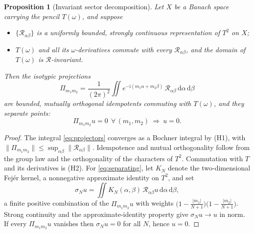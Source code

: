 \documentclass[aps,prd,reprint,superscriptaddress,nofootinbib,longbibliography]{revtex4-2}
\theoremstyle{plain}
\newtheorem{proposition}[theorem]{Proposition}
\theoremstyle{definition}
\theoremstyle{remark}
\newcommand{\dd}{\mathrm{d}}
\newcommand{\ii}{\mathrm{i}}
\begin{document}
\begin{proposition}[Invariant sector decomposition]\label{prop:decomp}
Let $X$ be a Banach space carrying the pencil $T(\omega)$, and suppose
\begin{itemize}
\item[(H1)] $\{\mathcal{R}_{\alpha\beta}\}$ is a uniformly bounded, strongly
continuous representation of $T^2$ on $X$;
\item[(H2)] $T(\omega)$ and all its $\omega$-derivatives commute with every
$\mathcal{R}_{\alpha\beta}$, and the domain of $T(\omega)$ is
$\mathcal{R}$-invariant.
\end{itemize}
Then the isotypic projections
\begin{equation}\label{eq:projectors}
  \Pi_{m_1m_2} = \frac{1}{(2\pi)^2}\iint
  e^{-\ii(m_1\alpha+m_2\beta)}\,\mathcal{R}_{\alpha\beta}\,
  \dd\alpha\,\dd\beta
\end{equation}
are bounded, mutually orthogonal idempotents commuting with $T(\omega)$, and
they separate points:
\begin{equation}\label{eq:separating}
  \Pi_{m_1m_2}u=0\ \ \forall\,(m_1,m_2)\ \Longrightarrow\ u=0 .
\end{equation}
\end{proposition}

\begin{proof}
The integral \eqref{eq:projectors} converges as a Bochner integral by (H1), with
$\|\Pi_{m_1m_2}\|\le\sup_{\alpha\beta}\|\mathcal{R}_{\alpha\beta}\|$.
Idempotence and mutual orthogonality follow from the group law and the
orthogonality of the characters of $T^2$. Commutation with $T$ and its
derivatives is (H2). For \eqref{eq:separating}, let $K_N$ denote the
two-dimensional Fej\'er kernel, a nonnegative approximate identity on $T^2$, and
set
\begin{equation}
  \sigma_N u = \iint K_N(\alpha,\beta)\,\mathcal{R}_{\alpha\beta}u\,
  \dd\alpha\,\dd\beta ,
\end{equation}
a finite positive combination of the $\Pi_{m_1m_2}u$ with weights
$\big(1-\tfrac{|m_1|}{N+1}\big)\big(1-\tfrac{|m_2|}{N+1}\big)$. Strong
continuity and the approximate-identity property give $\sigma_Nu\to u$ in norm.
If every $\Pi_{m_1m_2}u$ vanishes then $\sigma_Nu=0$ for all $N$, hence $u=0$.
\end{proof}
\end{document}
